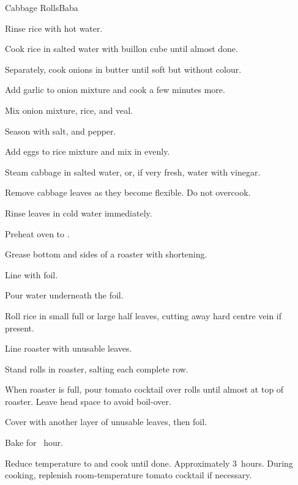 \begin{recipe}{Cabbage Rolls}{Baba}{}
\begin{directions}
\item Rinse rice with hot water.
\item Cook rice in salted water with buillon cube until almost done.
\item Separately, cook onions in butter until soft but without colour.
\item Add garlic to onion mixture and cook a few minutes more.
\item Mix onion mixture, rice, and veal.
\item Season with salt, and pepper.
\item Add eggs to rice mixture and mix in evenly.
\item Steam cabbage in salted water, or, if very fresh, water with vinegar.
\item Remove cabbage leaves as they become flexible. Do not overcook.
\item Rinse leaves in cold water immediately.
\item Preheat oven to .
\item Grease bottom and sides of a roaster with shortening.
\item Line with foil.
\item Pour water underneath the foil.
\item Roll rice in small full or large half leaves, cutting away hard centre vein if present.
\item Line roaster with unusable leaves.
\item Stand rolls in roaster, salting each complete row.
\item When roaster is full, pour tomato cocktail over rolls until almost at top of roaster. Leave head space to avoid boil-over.
\item Cover with another layer of unusable leaves, then foil.
\item Bake for \half~hour.
\item Reduce temperature to  and cook until done. Approximately 3~hours. During cooking, replenish room-temperature tomato cocktail if necessary.
\end{directions}

\end{recipe}

